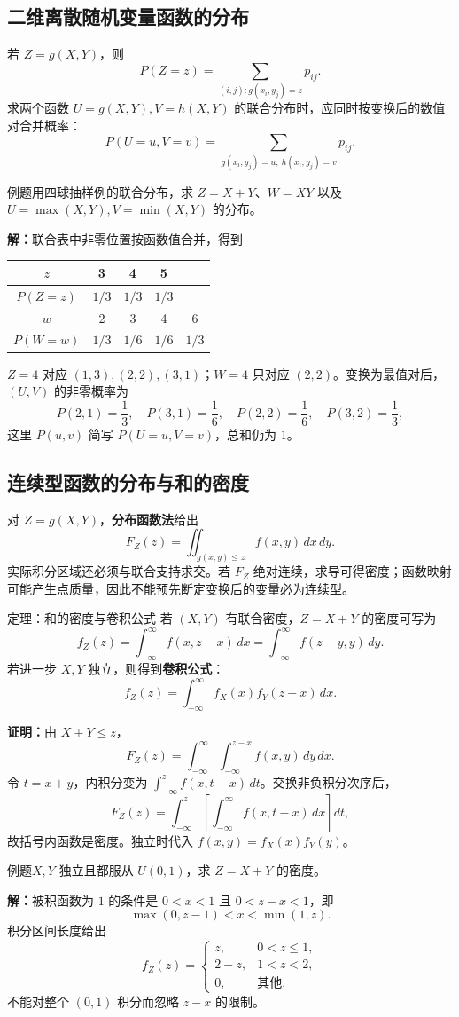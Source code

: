 \documentclass[UTF8,fontset=none,zihao=-4,a4paper]{ctexart}
\newcommand{\term}[1]{\textbf{#1}}
\newcommand{\example}[1]{\begin{infobox}{例题}#1\end{infobox}}
\newcommand{\solution}{\par\noindent\textbf{解：}}
\newcommand{\proof}{\par\noindent\textbf{证明：}}
\begin{document}
\subsection{二维离散随机变量函数的分布}
若 $Z=g(X,Y)$，则
\[
P(Z=z)=\sum_{(i,j):g(x_i,y_j)=z}p_{ij}.
\]
求两个函数 $U=g(X,Y),V=h(X,Y)$ 的联合分布时，应同时按变换后的数值对合并概率：
\[
P(U=u,V=v)=\sum_{g(x_i,y_j)=u,\ h(x_i,y_j)=v}p_{ij}.
\]
\example{用四球抽样例的联合分布，求 $Z=X+Y$、$W=XY$ 以及 $U=\max(X,Y),V=\min(X,Y)$ 的分布。}
\solution 联合表中非零位置按函数值合并，得到
\begin{center}\begin{tabular}{c|cccc}\toprule
$z$&3&4&5&\\\midrule
$P(Z=z)$&$1/3$&$1/3$&$1/3$&\\\midrule
$w$&2&3&4&6\\\midrule
$P(W=w)$&$1/3$&$1/6$&$1/6$&$1/3$\\\bottomrule
\end{tabular}\end{center}
$Z=4$ 对应 $(1,3),(2,2),(3,1)$；$W=4$ 只对应 $(2,2)$。变换为最值对后，$(U,V)$ 的非零概率为
\[
P(2,1)=\frac13,\quad P(3,1)=\frac16,\quad
P(2,2)=\frac16,\quad P(3,2)=\frac13,
\]
这里 $P(u,v)$ 简写 $P(U=u,V=v)$，总和仍为 $1$。
\subsection{连续型函数的分布与和的密度}
对 $Z=g(X,Y)$，\term{分布函数法}给出
\[
F_Z(z)=\iint_{g(x,y)\le z}f(x,y)\,dx\,dy.
\]
实际积分区域还必须与联合支持求交。若 $F_Z$ 绝对连续，求导可得密度；函数映射可能产生点质量，因此不能预先断定变换后的变量必为连续型。
\begin{infobox}{定理：和的密度与卷积公式}
若 $(X,Y)$ 有联合密度，$Z=X+Y$ 的密度可写为
\[
f_Z(z)=\int_{-\infty}^{\infty}f(x,z-x)\,dx
=\int_{-\infty}^{\infty}f(z-y,y)\,dy.
\]
若进一步 $X,Y$ 独立，则得到\term{卷积公式}：
\[
f_Z(z)=\int_{-\infty}^{\infty}f_X(x)f_Y(z-x)\,dx.
\]
\end{infobox}
\proof 由 $X+Y\le z$，
\[
F_Z(z)=\int_{-\infty}^{\infty}\int_{-\infty}^{z-x}f(x,y)\,dy\,dx.
\]
令 $t=x+y$，内积分变为 $\int_{-\infty}^z f(x,t-x)\,dt$。交换非负积分次序后，
\[
F_Z(z)=\int_{-\infty}^z\left[\int_{-\infty}^{\infty}f(x,t-x)\,dx\right]dt,
\]
故括号内函数是密度。独立时代入 $f(x,y)=f_X(x)f_Y(y)$。
\example{$X,Y$ 独立且都服从 $U(0,1)$，求 $Z=X+Y$ 的密度。}
\solution 被积函数为 $1$ 的条件是 $0<x<1$ 且 $0<z-x<1$，即
\[
\max(0,z-1)<x<\min(1,z).
\]
积分区间长度给出
\[
f_Z(z)=\begin{cases}z,&0<z\le1,\\2-z,&1<z<2,\\0,&\text{其他}.\end{cases}
\]
不能对整个 $(0,1)$ 积分而忽略 $z-x$ 的限制。
\end{document}
